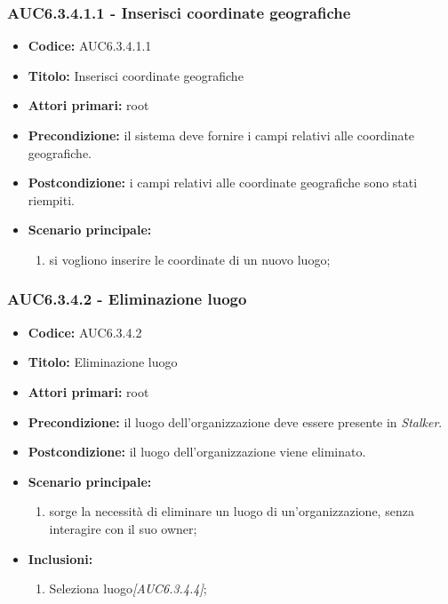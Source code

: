 \documentclass[casi-duso]{subfiles}
\begin{document}
\subsubsection{AUC6.3.4.1.1 - Inserisci coordinate geografiche}%
\label{subsub:AUC6.3.4.1.1}
\begin{itemize}
  \item \textbf{Codice:} AUC6.3.4.1.1
  \item \textbf{Titolo:} Inserisci coordinate geografiche
  \item \textbf{Attori primari:} root
  \item \textbf{Precondizione:} il sistema deve fornire i campi relativi alle coordinate geografiche.
  \item \textbf{Postcondizione:} i campi relativi alle coordinate geografiche sono stati riempiti.
  \item \textbf{Scenario principale:}
  \begin{enumerate}
    \item si vogliono inserire le coordinate di un nuovo luogo;
  \end{enumerate}
\end{itemize}

\subsubsection{AUC6.3.4.2 - Eliminazione luogo}%
\label{subsub:AUC6.3.4.2}
\begin{itemize}
  \item \textbf{Codice:} AUC6.3.4.2
  \item \textbf{Titolo:} Eliminazione luogo
  \item \textbf{Attori primari:} root
  \item \textbf{Precondizione:} il luogo dell'organizzazione deve essere presente in \emph{Stalker}.
  \item \textbf{Postcondizione:} il luogo dell'organizzazione viene eliminato.
  \item \textbf{Scenario principale:}
  \begin{enumerate}
    \item sorge la necessità di eliminare un luogo di un'organizzazione, senza interagire con il suo owner;
  \end{enumerate}
  \item \textbf{Inclusioni:}
  \begin{enumerate}
    \item Seleziona luogo\emph{[AUC6.3.4.4]};
  \end{enumerate}
\end{itemize}
\end{document}
